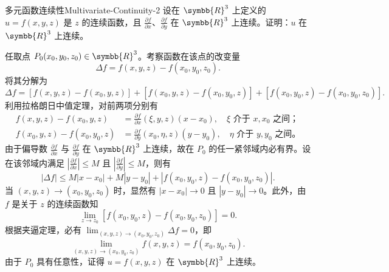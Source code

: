 \begin{problem}{多元函数连续性}{Multivariate-Continuity-2}
    设在 $\symbb{R}^3$ 上定义的 $u = f(x,y,z)$ 是 $z$ 的连续函数，且 $\frac{\partial f}{\partial x}$、$\frac{\partial f}{\partial y}$ 在 $\symbb{R}^3$ 上连续。证明：$u$ 在 $\symbb{R}^3$ 上连续。
\end{problem}

\begin{myproof}
    任取点 $P_0(x_0, y_0, z_0) \in \symbb{R}^3$。考察函数在该点的改变量
    \begin{equation}
        \Delta f = f(x, y, z) - f(x_0, y_0, z_0).
    \end{equation}
    将其分解为
    \begin{equation}
        \Delta f = [f(x, y, z) - f(x_0, y, z)] + [f(x_0, y, z) - f(x_0, y_0, z)] + [f(x_0, y_0, z) - f(x_0, y_0, z_0)].
    \end{equation}
    利用拉格朗日中值定理，对前两项分别有
    \begin{equation}
        \begin{aligned}
            f(x, y, z) - f(x_0, y, z)     & = \frac{\partial f}{\partial x}(\xi, y, z) (x - x_0), \quad \xi \text{ 介于 } x, x_0 \text{ 之间}；     \\
            f(x_0, y, z) - f(x_0, y_0, z) & = \frac{\partial f}{\partial y}(x_0, \eta, z) (y - y_0), \quad \eta \text{ 介于 } y, y_0 \text{ 之间}。
        \end{aligned}
    \end{equation}
    由于偏导数 $\frac{\partial f}{\partial x}$ 与 $\frac{\partial f}{\partial y}$ 在 $\symbb{R}^3$ 上连续，故在 $P_0$ 的任一紧邻域内必有界。设在该邻域内满足 $\left| \frac{\partial f}{\partial x} \right| \leqslant M$ 且 $\left| \frac{\partial f}{\partial y} \right| \leqslant M$，则有
    \begin{equation}
        |\Delta f| \leqslant M|x - x_0| + M|y - y_0| + |f(x_0, y_0, z) - f(x_0, y_0, z_0)|.
    \end{equation}
    当 $(x, y, z) \to (x_0, y_0, z_0)$ 时，显然有 $|x - x_0| \to 0$ 且 $|y - y_0| \to 0$。此外，由 $f$ 是关于 $z$ 的连续函数知
    \begin{equation}
        \lim_{z \to z_0} [f(x_0, y_0, z) - f(x_0, y_0, z_0)] = 0.
    \end{equation}
    根据夹逼定理，必有 $\lim_{(x, y, z) \to (x_0, y_0, z_0)} \Delta f = 0$，即
    \begin{equation}
        \boxed{\lim_{(x, y, z) \to (x_0, y_0, z_0)} f(x, y, z) = f(x_0, y_0, z_0)}.
    \end{equation}
    由于 $P_0$ 具有任意性，证得 $u = f(x, y, z)$ 在 $\symbb{R}^3$ 上连续。
\end{myproof}


